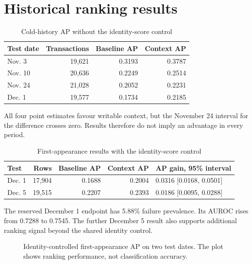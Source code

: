 \documentclass[12pt,a4paper,oneside]{report}
\begin{document}
\section{Historical ranking results}
\begin{table}[ht]\centering\caption{Cold-history AP without the identity-score control}
\begin{tabular}{lrrr}\toprule Test date&Transactions&Baseline AP&Context AP\\\midrule Nov. 3&19,621&0.3193&0.3787\\Nov. 10&20,636&0.2249&0.2514\\Nov. 24&21,028&0.2052&0.2231\\Dec. 1&19,577&0.1734&0.2185\\\bottomrule\end{tabular}\end{table}
All four point estimates favour writable context, but the November 24 interval for the difference crosses zero. Results therefore do not imply an advantage in every period.
\begin{table}[ht]\centering\caption{First-appearance results with the identity-score control}
\small\begin{tabularx}{\textwidth}{lrrrY}\toprule Test&Rows&Baseline AP&Context AP&AP gain, 95\% interval\\\midrule Dec. 1&17,904&0.1688&0.2004&0.0316 [0.0168, 0.0501]\\Dec. 5&19,515&0.2207&0.2393&0.0186 [0.0095, 0.0288]\\\bottomrule\end{tabularx}\end{table}
The reserved December 1 endpoint has 5.88\% failure prevalence. Its AUROC rises from 0.7288 to 0.7545. The further December 5 result also supports additional ranking signal beyond the shared identity control.
\begin{figure}[htbp]\centering
{}
\caption{Identity-controlled first-appearance AP on two test dates. The plot shows ranking performance, not classification accuracy.}
\end{figure}
\end{document}
